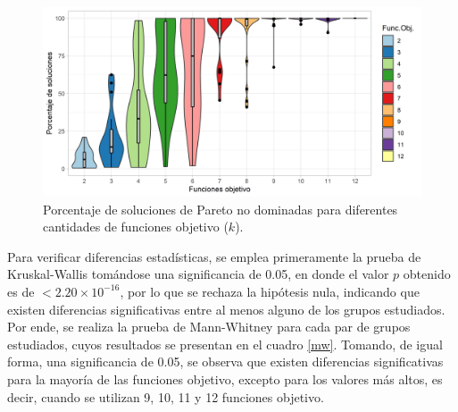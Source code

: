 \documentclass{article}
\begin{document}
\begin{figure}[ptb]
\begin{center}
\includegraphics[width=\linewidth]{p11.png}
\end{center}
\caption{Porcentaje de soluciones de Pareto no dominadas para diferentes cantidades de funciones objetivo ($k$).\label{box}}
\end{figure}

Para verificar diferencias estadísticas, se emplea primeramente la prueba de Kruskal-Wallis tomándose una significancia de 0.05, en donde el valor $p$ obtenido es de $<2.20\times10^{-16}$, por lo que se rechaza la hipótesis nula, indicando que existen diferencias significativas entre al menos alguno de los grupos estudiados. Por ende, se realiza la prueba de Mann-Whitney para cada par de grupos estudiados, cuyos resultados se presentan en el cuadro \ref{mw}. Tomando, de igual forma, una significancia de 0.05, se observa que existen diferencias significativas para la mayoría de las funciones objetivo, excepto para los valores más altos, es decir, cuando se utilizan 9, 10, 11 y 12 funciones objetivo.
\end{document}
